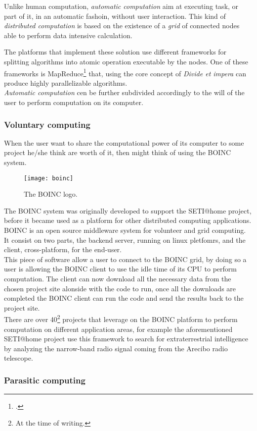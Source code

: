 Unlike human computation, \emph{automatic computation} aim at executing task, or
part of it, in an automatic fashoin, without user interaction. This kind of
\emph{distributed computation} is based on the existence of a \emph{grid} of
connected nodes able to perform data intensive calculation.

The platforms that implement these solution use different frameworks for splitting
algorithms into atomic operation executable by the nodes. One of these frameworks
is MapReduce\footcite{dean2008mapreduce} that, using the core concept of
\emph{Divide et impera} can produce highly parallelizable algorithms.\\

\emph{Automatic computation} cen be further subdivided accordingly to the will
of the user to perform computation on its computer.

\subsubsection{Voluntary computing}
\label{sec:bg:crowd:auto:voluntary}
When the user want to share the computational power of its computer to some
project he/she think are worth of it, then might think of using the \ac{BOINC}
system.\\

\begin{figure}[htb]
    \centering
    \texttt{[image: boinc]}
    \caption{The \acs{BOINC} logo.}
    \label{fig:boinc}
\end{figure}
The \ac{BOINC} system was originally developed to support the \ac{SETI@home}
project, before it became used as a platform for other distributed computing
applications. \ac{BOINC} is an open source middleware system for volunteer
and grid computing. It consist on two parts, the backend server, running on
linux pletfomrs, and the client, cross-platform, for the end-user.\\

This piece of software allow a user to connect to the \ac{BOINC} grid, by doing
so a user is allowing the \ac{BOINC} client to use the idle time of its CPU to
perform computation. The client can now  download all the necessary data from the
chosen project site alonside with the code to run, once all the downloads are
completed the \ac{BOINC} client can run the code and send the results back to
the project site.\\

There are over 40\footnote{At the time of writing.} projects that leverage on
the \ac{BOINC} platform to perform computation on different application areas,
for example the aforementioned \ac{SETI@home} project use this framework to
search for extraterrestrial intelligence by analyzing the narrow-band radio
signal coming from the Arecibo radio telescope.


\subsubsection{Parasitic computing}
\label{sec:bg:crowd:auto:parasitic}
